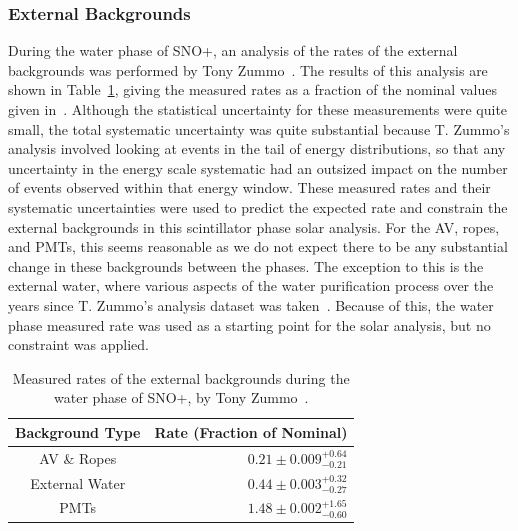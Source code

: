 \subsubsection{External Backgrounds}
During the water phase of SNO+, an analysis of the rates of the external backgrounds was performed by Tony Zummo~\cite{zummoExternalBackgroundBox2022}. %
The results of this analysis are shown in Table~\ref{tab:externals_rates_zummo}, giving the measured rates as a fraction of the nominal values given in~\cite{andringaCurrentStatusFuture2016}. %
Although the statistical uncertainty for these measurements were quite small, the total systematic uncertainty was quite substantial because T. Zummo's analysis involved looking at events in the tail of energy distributions, so that any uncertainty in the energy scale systematic had an outsized impact on the number of events observed within that energy window. These measured rates and their systematic uncertainties were used to predict the expected rate and constrain the external backgrounds in this scintillator phase solar analysis. For the AV, ropes, and PMTs, this seems reasonable as we do not expect there to be any substantial change in these backgrounds between the phases. The exception to this is the external water, where various aspects of the water purification process over the years since T. Zummo's analysis dataset was taken~\cite{kaptanogluFirstLookExternal2023}. Because of this, the water phase measured rate was used as a starting point for the solar analysis, but no constraint was applied.

\begin{table}
    \centering
    \begin{tabular}{c r}
        \hline
        Background Type & Rate (Fraction of Nominal)  \\ \hline \hline
        AV \& Ropes    & $0.21\pm0.009^{+0.64}_{-0.21}$  \\
        External Water & $0.44\pm0.003^{+0.32}_{-0.27}$  \\
        PMTs           & $1.48\pm0.002^{+1.65}_{-0.60}$  \\
        \hline
    \end{tabular}
    \caption{Measured rates of the external backgrounds during the water phase of SNO+, by Tony Zummo~\cite{zummoExternalBackgroundBox2022}. %
    }
    \label{tab:externals_rates_zummo}
\end{table}

